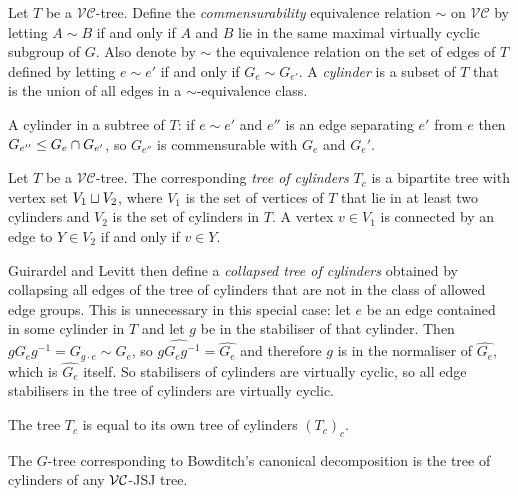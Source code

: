 \begin{definition} 
  Let $T$ be a $\mathcal{VC}$-tree. 
  Define the \emph{commensurability} equivalence relation $\sim$ on $\mathcal{VC}$ by letting $A \sim B$ if and only if $A$ and $B$ lie in the same maximal virtually cyclic subgroup of $G$. 
  Also denote by $\sim$ the equivalence relation on the set of edges of $T$ defined by letting $e \sim e'$ if and only if $G_e \sim G_{e'}$. 
  A \emph{cylinder} is a subset of $T$ that is the union of all edges in a $\sim$-equivalence class.
\end{definition}

A cylinder in a subtree of $T$: if $e\sim e'$ and $e''$ is an edge separating $e'$ from $e$ then $G_{e''} \leq G_e \cap G_{e'}$, so $G_{e''}$ is commensurable with $G_e$ and $G_e'$.

\begin{definition} 
  Let $T$ be a $\mathcal{VC}$-tree. 
  The corresponding \emph{tree of cylinders} $T_c$ is a bipartite tree with vertex set $V_1 \sqcup V_2$, where $V_1$ is the set of vertices of $T$ that lie in at least two cylinders and $V_2$ is the set of cylinders in $T$. 
  A vertex $v \in V_1$ is connected by an edge to $Y \in V_2$ if and only if $v \in Y$.
\end{definition}

\begin{remark}
  Guirardel and Levitt then define a \emph{collapsed tree of cylinders} obtained by collapsing all edges of the tree of cylinders that are not in the class of allowed edge groups.
  This is unnecessary in this special case: let $e$ be an edge contained in some cylinder in $T$ and let $g$ be in the stabiliser of that cylinder.
  Then $gG_eg^{-1} = G_{g\cdot e} \sim G_e$, so $\widehat{gG_eg^{-1}} = \widehat{G_e}$ and therefore $g$ is in the normaliser of $\widehat{G_e}$, which is $\widehat{G_e}$ itself.
  So stabilisers of cylinders are virtually cyclic, so all edge stabilisers in the tree of cylinders are virtually cyclic.
\end{remark}

\begin{lemma}\cite[Lemma 7.3]{guirardellevitt17}\label{lemma:equal_to_its_own_cylinders}
  The tree $T_c$ is equal to its own tree of cylinders $(T_c)_c$.
\end{lemma}

\begin{lemma}
  The $G$-tree corresponding to Bowditch's canonical decomposition is the tree of cylinders of any $\mathcal{VC}$-JSJ tree.
\end{lemma}

